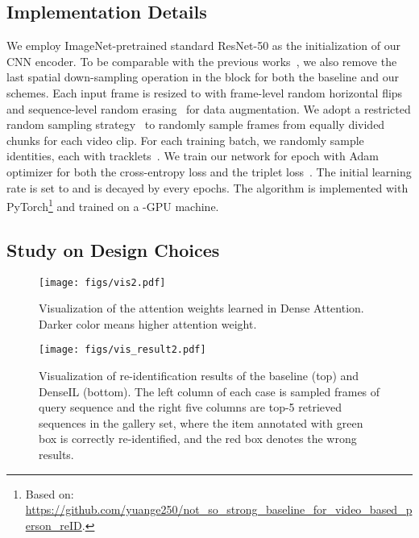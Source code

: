 \documentclass[10pt,twocolumn,letterpaper]{article}
\begin{document}
\subsection{Implementation Details}
\label{exp:expdetail}
We employ ImageNet-pretrained standard ResNet-50 as the initialization of our CNN encoder. To be comparable with the previous works~\cite{sun2018beyond,liu2019spatially,zhang2020multi,yang2020spatial}, we also remove the last spatial down-sampling operation in the  block for both the baseline and our schemes. Each input frame is resized to  with frame-level random horizontal flips~\cite{liu2019spatially} and sequence-level random erasing~\cite{zhong2020random,zhang2020multi,chen2020temporal} for data augmentation. We adopt a restricted random sampling strategy~\cite{li2018diversity,liu2019spatially,yang2020spatial} to randomly sample frames from equally divided  chunks for each video clip. For each training batch, we randomly sample  identities, each with  tracklets~\cite{hermans2017defense,yang2020spatial}. We train our network for  epoch with Adam optimizer for both the cross-entropy loss and the triplet loss~\cite{hermans2017defense}. The initial learning rate is set to  and is decayed by  every  epochs. The algorithm is implemented with PyTorch\footnote{Based on: \url{https://github.com/yuange250/not_so_strong_baseline_for_video_based_person_reID}.} and trained on a -GPU machine.


\subsection{Study on Design Choices}
\label{exp:instantiations}



\begin{figure*}[ht]
	\centering
	\texttt{[image: figs/vis2.pdf]}
	\caption{Visualization of the attention weights learned in Dense Attention. Darker color means higher attention weight.}
	\vspace{-3mm}
	\label{fig:vis}
\end{figure*}

\begin{figure}[ht]
	\centering
	\texttt{[image: figs/vis\_result2.pdf]}
	\caption{Visualization of re-identification results of the baseline (top) and DenseIL (bottom). The left column of each case is sampled frames of query sequence and the right five columns are top-5 retrieved sequences in the gallery set, where the item annotated with green box is correctly re-identified, and the red box denotes the wrong results.}
	\vspace{-3mm}
	\label{fig:vis_result}
\end{figure}
\end{document}
